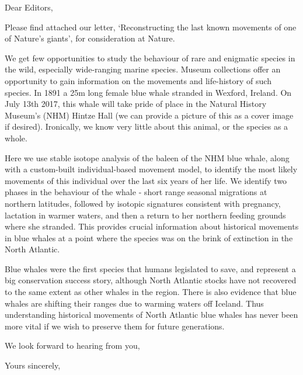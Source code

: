 \documentclass[11pt]{letter}
\begin{document}
\begin{letter}{}
\opening{Dear Editors,}

Please find attached our letter, `Reconstructing the last known movements of one of Nature's giants', for consideration at Nature.

We get few opportunities to study the behaviour of rare and enigmatic species in the wild, especially wide-ranging marine species. 
Museum collections offer an opportunity to gain information on the movements and life-history of such species. 
In 1891 a 25m long female blue whale stranded in Wexford, Ireland. 
On July 13th 2017, this whale will take pride of place in the Natural History Museum's (NHM) Hintze Hall (we can provide a picture of this as a cover image if desired).
Ironically, we know very little about this animal, or the species as a whole. 

Here we use stable isotope analysis of the baleen of the NHM blue whale, along with a custom-built individual-based movement model, to identify the most likely movements of this individual over the last six years of her life. We identify two phases in the behaviour of the whale - short range seasonal migrations at northern latitudes, followed by isotopic signatures consistent with pregnancy, lactation in warmer waters, and then a return to her northern feeding grounds where she stranded. This provides crucial information about historical movements in blue whales at a point where the species was on the brink of extinction in the North Atlantic.

Blue whales were the first species that humans legislated to save, and represent a big conservation success story, although North Atlantic stocks have not recovered to the same extent as other whales in the region. There is also evidence that blue whales are shifting their ranges due to warming waters off Iceland. Thus understanding historical movements of North Atlantic blue whales has never been more vital if we wish to preserve them for future generations.
 
We look forward to hearing from you,


\closing{Yours sincerely,}


\end{letter}
\end{document}
